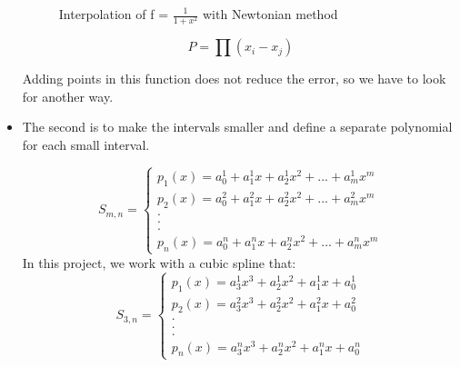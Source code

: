 \documentclass[12pt]{article}
\begin{document}
\begin{itemize}
\begin{figure}[h]
    \caption{Interpolation of f = $\frac{1}{1+x^2}$ with Newtonian method }
    \label{fig:mesh1}
\end{figure} 
\begin{equation}
P = \prod(x_i - x_j)
\end{equation}

Adding points in this function does not reduce the error, so we have to look for another way.

\item The second is to make the intervals smaller and define a separate polynomial for each small interval.

\begin{equation}
  S_{m,n}=\begin{cases}
    p_{1}(x) = a_0^1 + a_1^1 x + a_2^1 x^2 + ... + a_m^1 x^m\\
    p_{2}(x) = a_0^2 + a_1^2 x + a_2^2 x^2 + ... + a_m^2 x^m\\
    .\\
    .\\
    .\\
    p_{n}(x) = a_0^n + a_1^n x + a_2^n x^2 + ... + a_m^n x^m
  \end{cases}
\end{equation}
In this project, we work with a cubic spline that: \\
\begin{equation}
  S_{3,n}=\begin{cases}
    p_{1}(x) = a^1_{3}x^3 + a^1_{2}x^2 + a_{1}^1x + a_0^1\\
    p_{2}(x) = a^2_{3}x^3 + a^2_{2}x^2 + a_{1}^2x + a_0^2\\
    .\\
    .\\
    .\\
    p_{n}(x) = a^n_{3}x^3 + a^n_{2}x^2 + a_{1}^nx + a_0^n
  \end{cases}
\end{equation}


\end{itemize}
\end{document}
